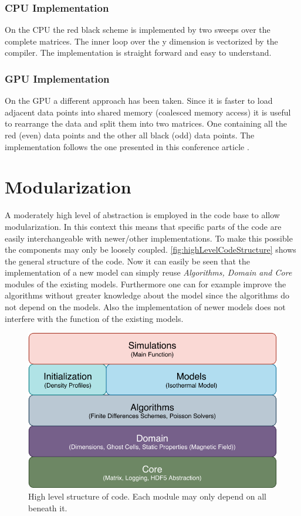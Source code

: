\documentclass[master.tex]{subfiles}
\begin{document}
\subsubsection{CPU Implementation}
On the CPU the red black scheme is implemented by two sweeps over the complete matrices. The inner loop over the y dimension is vectorized by the compiler. The implementation is straight forward and easy to understand.

\subsubsection{GPU Implementation}
On the GPU a different approach has been taken. Since it is faster to load adjacent data points into shared memory (coalesced memory access) it is useful to rearrange the data and split them into two matrices. One containing all the red (even) data points and the other all black (odd) data points. The implementation follows the one presented in this conference article \cite{CUDARedBlack}.

\section{Modularization}
A moderately high level of abstraction is employed in the code base to allow modularization. In this context this means that specific parts of the code are easily interchangeable with newer/other implementations. To make this possible the components may only be loosely coupled. \autoref{fig:highLevelCodeStructure} shows the general structure of the code. Now it can easily be seen that the implementation of a new model can simply reuse \textit{Algorithms, Domain and Core} modules of the existing models. Furthermore one can for example improve the algorithms without greater knowledge about the model since the algorithms do not depend on the models. Also the implementation of newer models does not interfere with the function of the existing models.
\begin{figure}[h]
    \centering
    \includegraphics[]{pdfs/code_modules_high_level.pdf}
    \caption{High level structure of code. Each module may only depend on all beneath it.}
    \label{fig:highLevelCodeStructure}
\end{figure}
\end{document}
